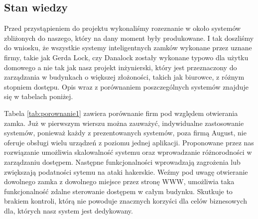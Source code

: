 \newpage
\subsection{Stan wiedzy}\label{sec:Stan wiedzy}
Przed przystąpieniem do projektu wykonaliśmy rozeznanie w około systemów zbliżonych do naszego, który na dany moment były produkowane. I tak doszliśmy do wniosku, że wszystkie systemy inteligentnych zamków wykonane przez uznane firmy, takie jak Gerda Lock, czy Danalock zostały wykonane typowo dla użytku domowego a nie tak jak nasz projekt inżynierski, który jest przeznaczony do zarządzania w budynkach o większej złożoności, takich jak biurowce, z różnym stopniem dostępu. Opis wraz z porównaniem poszczególnych systemów znajduje się w tabelach poniżej.

Tabela \ref{tab:porownanie1} zawiera porównanie firm pod względem otwierania zamka. Już w pierwszym wierszu można zauważyć, indywidualne zastosowanie systemów, ponieważ każdy z prezentowanych systemów, poza firmą August, nie oferuje obsługi wielu urządzeń z poziomu jednej aplikacji. Proponowane przez nas \linebreak rozwiązanie umożliwia skalowalność systemu oraz wprowadzanie różnorodności w zarządzaniu dostępem. Następne funkcjonalności wprowadzają zagrożenia lub zwiększają podatności sytemu na ataki hakerskie. Weźmy pod uwagę otwieranie dowolnego zamka z dowolnego miejsce przez stronę WWW, umożliwia taka funkcjonalność zdalne sterowanie dostępem w całym budynku. Skutkuje to \linebreak brakiem kontroli, którą nie powoduje znacznych korzyści dla celów biznesowych dla, których nasz system jest dedykowany.
